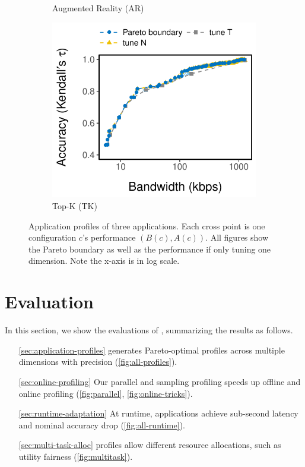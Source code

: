 \begin{figure}[htb]
\begin{subfigure}[t]{0.32\textwidth}
    \caption{Augmented Reality (AR)}
    \label{fig:ar-profile}
  \end{subfigure}
  \hfill
  \begin{subfigure}[t]{0.32\textwidth}
    \centering
    \includegraphics[width=\textwidth]{figures/profile-topk.pdf}
    \caption{Top-K (TK)}
    \label{fig:tk-profile}
  \end{subfigure}
  \caption{Application profiles of three applications. Each cross point is one
    configuration $c$'s performance $(B(c), A(c))$. All figures show the Pareto
    boundary as well as the performance if only tuning one dimension. Note the
    x-axis is in log scale.}
  \label{fig:all-profiles}
\end{figure}

\newpage

\section{Evaluation}
\label{sec:evaluation}

In this section, we show the evaluations of \sysname{}, summarizing the results
as follows.

\begin{itemize}
\item[\autoref{sec:application-profiles}] \sysname{} generates Pareto-optimal
  profiles across multiple dimensions with precision
  (\autoref{fig:all-profiles}).
\item[\autoref{sec:online-profiling}] Our parallel and sampling profiling speeds
  up offline and online profiling (\autoref{fig:parallel},
  \autoref{fig:online-tricks}).
\item[\autoref{sec:runtime-adaptation}] At runtime, \sysname{} applications
  achieve sub-second latency and nominal accuracy drop
  (\autoref{fig:all-runtime}).
\item[\autoref{sec:multi-task-alloc}] \sysname{} profiles allow different
  resource allocations, such as utility fairness (\autoref{fig:multitask}).
\end{itemize}

